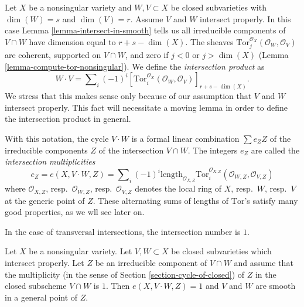 \noindent
Let $X$ be a nonsingular variety and $W, V \subset X$
be closed subvarieties with $\dim(W) = s$ and $\dim(V) = r$.
Assume $V$ and $W$ intersect properly.
In this case Lemma \ref{lemma-intersect-in-smooth} tells us all irreducible
components of $V \cap W$ have dimension equal to $r + s - \dim(X)$.
The sheaves $\text{Tor}_j^{\mathcal{O}_X}(\mathcal{O}_W, \mathcal{O}_V)$ are
coherent, supported on $V \cap W$, and zero if $j < 0$ or $j > \dim(X)$
(Lemma \ref{lemma-compute-tor-nonsingular}).
We define the {\it intersection product} as
$$
W \cdot V = \sum\nolimits_i (-1)^i
[\text{Tor}_i^{\mathcal{O}_X}(\mathcal{O}_W, \mathcal{O}_V)]_{r + s - \dim(X)}.
$$
We stress that this makes sense only because of our assumption that
$V$ and $W$ intersect properly. This fact will necessitate a moving
lemma in order to define the intersection product in general.

\medskip\noindent
With this notation, the cycle $V \cdot W$ is a formal linear
combination $\sum e_Z Z$ of the irreducible components $Z$
of the intersection $V \cap W$. The integers $e_Z$ are called
the {\it intersection multiplicities}
$$
e_Z = e(X, V \cdot W, Z) =
\sum\nolimits_i
(-1)^i
\text{length}_{\mathcal{O}_{X, Z}}
\text{Tor}_i^{\mathcal{O}_{X, Z}}(\mathcal{O}_{W, Z}, \mathcal{O}_{V, Z})
$$
where $\mathcal{O}_{X, Z}$, resp.\ $\mathcal{O}_{W, Z}$,
resp.\ $\mathcal{O}_{V, Z}$ denotes the local ring of $X$, resp.\ $W$,
resp.\ $V$ at the generic point of $Z$.
These alternating sums of lengths of $\text{Tor}$'s satisfy many good
properties, as we wll see later on.

\medskip\noindent
In the case of transversal intersections, the intersection number is $1$.

\begin{lemma}
\label{lemma-transversal}
Let $X$ be a nonsingular variety. Let $V, W \subset X$ be
closed subvarieties which intersect properly. Let $Z$ be an irreducible
component of $V \cap W$ and assume that the multiplicity
(in the sense of Section \ref{section-cycle-of-closed}) of $Z$
in the closed subscheme $V \cap W$ is $1$.
Then $e(X, V \cdot W, Z) = 1$ and $V$ and $W$ are smooth
in a general point of $Z$.
\end{lemma}

